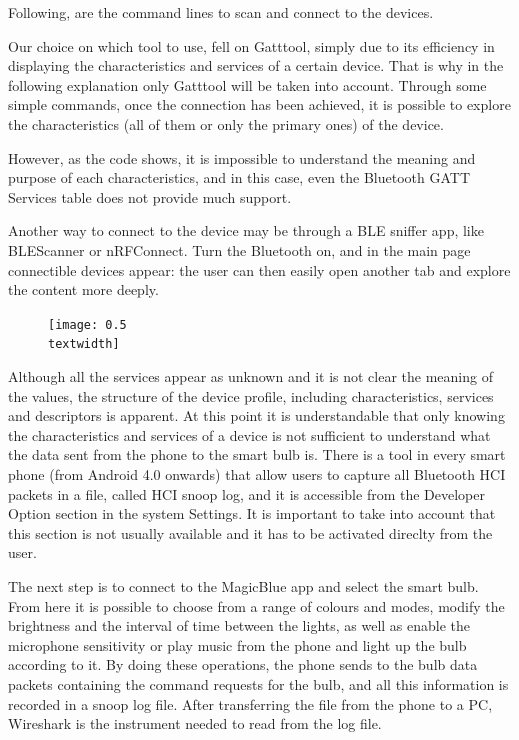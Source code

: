 Following, are the command lines to scan and connect to the devices.





Our choice on which tool to use, fell on Gatttool, simply due to its efficiency in displaying the characteristics and services of a certain device. That is why in the following explanation only Gatttool will be taken into account.
Through some simple commands, once the connection has been achieved, it is possible to explore the characteristics (all of them or only the primary ones) of the device.



However, as the code shows, it is impossible to understand the meaning and purpose of each characteristics, and in this case, even the Bluetooth GATT Services table does not provide much support.

Another way to connect to the device may be through a BLE sniffer app, like BLEScanner or nRFConnect.
Turn the Bluetooth on, and in the main page connectible devices appear: the user can then easily open another tab and explore the content more deeply.

\begin{figure}
	\centering
		\texttt{[image: 0.5\\textwidth]}
	\label{fig:images\nrfConnect}
\end{figure}	

Although all the services appear as unknown and it is not clear the meaning of the values, the structure of the device profile, including characteristics, services and descriptors is apparent.
At this point it is understandable that only knowing the characteristics and services of a device is not sufficient to understand what the data sent from the phone to the smart bulb is. There is a tool in every smart phone (from Android 4.0 onwards) that allow users to capture all Bluetooth HCI packets in a file, called HCI snoop log, and it is accessible from the Developer Option section in the system Settings. It is important to take into account that this section is not usually available and it has to be activated direclty from the user.

The next step is to connect to the MagicBlue app and select the smart bulb. From here it is possible to choose from a range of colours and modes, modify the brightness and the interval of time between the lights, as well as enable the microphone sensitivity or play music from the phone and light up the bulb according to it.
By doing these operations, the phone sends to the bulb data packets containing the command requests for the bulb, and  all this information is recorded in a snoop log file.
After transferring the file from the phone to a PC, Wireshark is the instrument needed to read from the log file.

